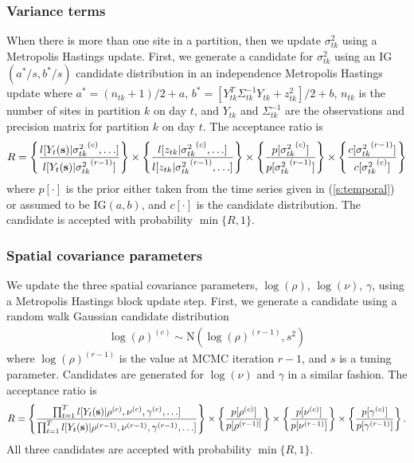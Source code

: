 \documentclass[11pt]{article}
\begin{document}
\subsubsection*{Variance terms}
When there is more than one site in a partition, then we update $\sigma^2_{tk}$ using a Metropolis Hastings update.
First, we generate a candidate for $\sigma^2_{tk}$ using an IG$(a^*/s, b^*/s)$ candidate distribution in an independence Metropolis Hastings update where $a^* = (n_{tk} + 1) / 2 + a$, $b^* = [Y_{tk}^T \Sigma^{-1}_{tk} Y_{tk} + z_{tk}^2] / 2 + b$, $n_{tk}$ is the number of sites in partition $k$ on day $t$, and $Y_{tk}$ and $\Sigma^{-1}_{tk}$ are the observations and precision matrix for partition $k$ on day $t$.
The acceptance ratio is
\begin{align*}
  R = \left\{
    \frac{ l[Y_t(\mbox{\bf s}) | {\sigma^2_{tk}}^{(c)}, \ldots] }
         { l[Y_t(\mbox{\bf s}) | {\sigma^2_{tk}}^{(r - 1)}]}
    \right\} \times \left\{
    \frac{ l[z_{tk} | {\sigma^2_{tk}}^{(c)}, \ldots] }
         { l[z_{tk} | {\sigma^2_{tk}}^{(r - 1)}, \ldots] }
    \right\} \times \left\{
    \frac{ p[ {\sigma^2_{tk}}^{(c)} ] }
         { p[ {\sigma^2_{tk}}^{(r - 1)}] }
    \right\} \times \left\{
    \frac{ c[ {\sigma^2_{tk}}^{(r - 1)}] }
         { c[ {\sigma^2_{tk}}^{(c)}]}
    \right\}
\end{align*}
where $p[\cdot]$ is the prior either taken from the time series given in (\ref{s:temporal}) or assumed to be IG$(a, b)$, and $c[\cdot]$ is the candidate distribution.
The candidate is accepted with probability $\min\{R, 1\}$.

\subsubsection*{Spatial covariance parameters}
We update the three spatial covariance parameters, $\log(\rho)$, $\log(\nu)$, $\gamma$, using a Metropolis Hastings block update step.
First, we generate a candidate using a random walk Gaussian candidate distribution
\begin{align*}
	\log(\rho)^{(c)} \sim \text{N}(\log(\rho)^{(r - 1)}, s^2)
\end{align*}
where $\log(\rho)^{(r-1)}$ is the value at MCMC iteration $r - 1$, and $s$ is a tuning parameter.
Candidates are generated for $\log(\nu)$ and $\gamma$ in a similar fashion.
The acceptance ratio is
\begin{align*}
	R = \left\{ \frac{ \prod_{t = 1}^{T} l[Y_t(\mbox{\bf s}) | \rho^{(c)}, \nu^{(c)}, \gamma^{(c)}, \ldots] }{\prod_{t = 1}^{T} l[Y_t(\mbox{\bf s}) | \rho^{(r-1)}, \nu^{(r-1)}, \gamma^{(r-1)}, \ldots] } \right\} \times \left\{ \frac{ p[\rho^{(c)}] }{ p[\rho^{(r - 1)] } } \right\} \times \left\{ \frac{ p[\nu^{(c)}] }{ p[\nu^{(r - 1)}] } \right\} \times \left\{ \frac{ p[ \gamma^{(c)} ] }{ p[\gamma^{(r - 1)} ] } \right\}.
\end{align*}
All three candidates are accepted with probability $\min\{R, 1\}$.
\end{document}
